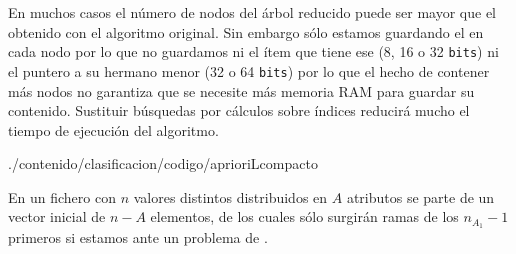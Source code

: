 En muchos casos el número de nodos del árbol reducido puede ser mayor que el obtenido con el algoritmo original. Sin embargo sólo estamos guardando el \soporte en cada nodo por lo que no guardamos ni el ítem que tiene ese \soporte (8, 16 o 32 \texttt{bits}) ni el puntero a su hermano menor (32 o 64 \texttt{bits}) por lo que el hecho de contener más nodos no garantiza que se necesite más memoria RAM para guardar su contenido. Sustituir búsquedas por cálculos sobre índices reducirá mucho el tiempo de ejecución del algoritmo.

\afterpage{\clearpage}

                 {./contenido/clasificacion/codigo/aprioriLcompacto}











En un fichero con $n$ valores distintos distribuidos en $A$ atributos se parte de un vector inicial de $n - A$ elementos, de los cuales sólo surgirán ramas de los $n_{A_1} - 1$ primeros si estamos ante un problema de \clasificacion.
